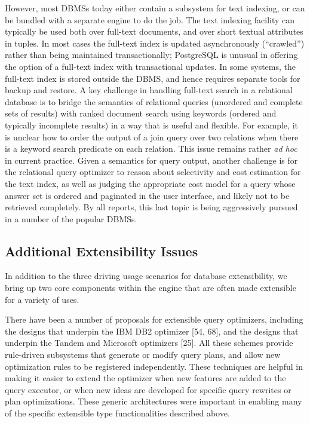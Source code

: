 \documentclass[b5paper,11pt,twoside,openright]{book}
\begin{document}
However, most DBMSs today either contain a subsystem for text indexing,
or can be bundled with a separate engine to do the job. The text
indexing facility can typically be used both over full-text documents,
and over short textual attributes in tuples. In most cases the full-text
index is updated asynchronously (``crawled'') rather than being
maintained transactionally; PostgreSQL is unusual in offering the option
of a full-text index with transactional updates. In some systems,
the full-text index is stored outside the DBMS, and hence requires
separate tools for backup and restore. A key challenge in handling
full-text search in a relational database is to bridge the semantics of
relational queries (unordered and complete sets of results) with ranked
document search using keywords (ordered and typically incomplete
results) in a way that is useful and flexible. For example, it is
unclear how to order the output of a join query over two relations when
there is a keyword search predicate on each relation. This issue remains
rather \emph{ad hoc} in current practice. Given a semantics for query
output, another challenge is for the relational query optimizer to
reason about selectivity and cost estimation for the text index, as well
as judging the appropriate cost model for a query whose answer set is
ordered and paginated in the user interface, and likely not to be
retrieved completely. By all reports, this last topic is being
aggressively pursued in a number of the popular DBMSs.

\hypertarget{additional-extensibility-issues}{%
\subsection{Additional Extensibility
Issues}\label{additional-extensibility-issues}}

In addition to the three driving usage scenarios for database
extensibility, we bring up two core components within the engine that
are often made extensible for a variety of uses.

There have been a number of proposals for extensible query optimizers,
including the designs that underpin the IBM DB2 optimizer {[}54, 68{]},
and the designs that underpin the Tandem and Microsoft optimizers {[}25{]}.
All these schemes provide rule-driven subsystems that generate or
modify query plans, and allow new optimization rules to be registered
independently. These techniques are helpful in making it easier to
extend the optimizer when new features are added to the query
executor, or when new ideas are developed for specific query rewrites
or plan optimizations. These generic architectures were important in
enabling many of the specific extensible type functionalities
described above.
\end{document}
